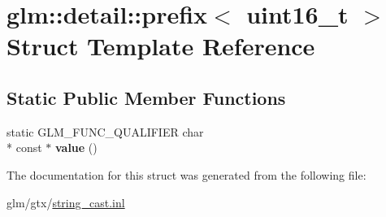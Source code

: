 \hypertarget{structglm_1_1detail_1_1prefix_3_01uint16__t_01_4}{\section{glm\-:\-:detail\-:\-:prefix$<$ uint16\-\_\-t $>$ Struct Template Reference}
\label{structglm_1_1detail_1_1prefix_3_01uint16__t_01_4}
}
\subsection*{Static Public Member Functions}
\begin{DoxyCompactItemize}
\item 
\hypertarget{structglm_1_1detail_1_1prefix_3_01uint16__t_01_4_a9546e8aaf707c3f0028c8da94f6c06da}{static G\-L\-M\-\_\-\-F\-U\-N\-C\-\_\-\-Q\-U\-A\-L\-I\-F\-I\-E\-R char \\*
const $\ast$ {\bfseries value} ()}\label{structglm_1_1detail_1_1prefix_3_01uint16__t_01_4_a9546e8aaf707c3f0028c8da94f6c06da}

\end{DoxyCompactItemize}


The documentation for this struct was generated from the following file\-:\begin{DoxyCompactItemize}
\item 
glm/gtx/\hyperlink{string__cast_8inl}{string\-\_\-cast.\-inl}\end{DoxyCompactItemize}
